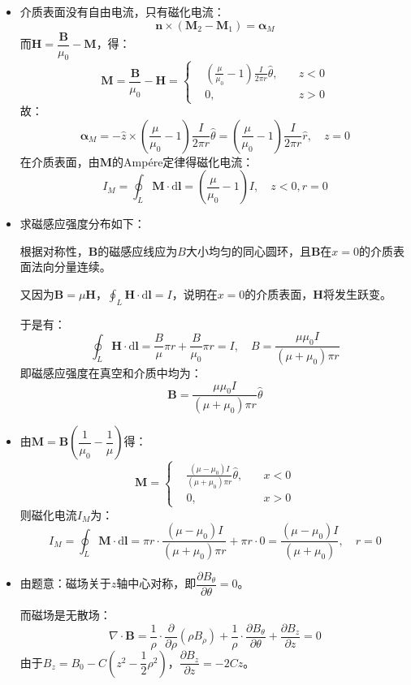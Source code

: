 \documentclass[a4paper,fontset=none]{ctexart}
\begin{document}
\begin{itemize}
    \item[3.(2)]
    介质表面没有自由电流，只有磁化电流：
    \[
    \bm{n}\times(\bm{M}_2-\bm{M}_1) = \bm{\alpha}_M
    \]
    而$\bm{H}=\dfrac{\bm{B}}{\mu_0}-\bm{M}$，得：
    \[
    \bm{M} = \frac{\bm{B}}{\mu_0}-\bm{H} =
    \left\{
        \begin{aligned}
            &\left(\frac{\mu}{\mu_0}-1\right)\frac{I}{2\pi r}\hat{\theta},\quad &z<0 \\
            &0,\quad &z>0
        \end{aligned}
    \right.
    \]
    故：
    \[
    \bm{\alpha}_M = -\hat{z}\times\left(\frac{\mu}{\mu_0}-1\right)\frac{I}{2\pi r}\hat{\theta} = \left(\frac{\mu}{\mu_0}-1\right)\frac{I}{2\pi r}\hat{r},\quad z=0
    \]
    在介质表面，由$\bm{M}$的Amp\'{e}re定律得磁化电流：
    \[
    I_M = \oint_L \bm{M}\cdot\mathrm{d}\bm{l} = \left(\frac{\mu}{\mu_0}-1\right)I,\quad z<0,r=0
    \]

    \item[4.(1)]
    求磁感应强度分布如下：

    根据对称性，$\bm{B}$的磁感应线应为$B$大小均匀的同心圆环，且$\bm{B}$在$x=0$的介质表面法向分量连续。
    
    又因为$\bm{B}=\mu\bm{H}$，$\displaystyle{\oint_L \bm{H}\cdot\mathrm{d}\bm{l}=I}$，说明在$x=0$的介质表面，$\bm{H}$将发生跃变。

    于是有：
    \[
    \oint_L \bm{H}\cdot\mathrm{d}\bm{l} = \frac{B}{\mu}\pi r + \frac{B}{\mu_0}\pi r = I,\quad B = \frac{\mu\mu_0 I}{(\mu+\mu_0)\pi r}
    \]
    即磁感应强度在真空和介质中均为：
    \[
    \bm{B} = \frac{\mu\mu_0 I}{(\mu+\mu_0)\pi r}\hat{\theta}
    \]

    \item[4.(2)]
    由$\bm{M}=\bm{B}\left(\dfrac{1}{\mu_0}-\dfrac{1}{\mu}\right)$得：
    \[
    \bm{M} =
    \left\{
        \begin{aligned}
            &\frac{(\mu-\mu_0)I}{(\mu+\mu_0)\pi r}\hat{\theta},\quad &x<0 \\
            &0,\quad &x>0
        \end{aligned}
    \right.
    \]
    则磁化电流$I_M$为：
    \[
    I_M = \oint_L \bm{M}\cdot\mathrm{d}\bm{l} = \pi r \cdot \frac{(\mu-\mu_0)I}{(\mu+\mu_0)\pi r} + \pi r \cdot 0 = \frac{(\mu-\mu_0)I}{(\mu+\mu_0)},\quad r=0
    \]

    \item[5.]
    由题意：磁场关于$z$轴中心对称，即$\dfrac{\partial B_\theta}{\partial\theta}=0$。

    而磁场是无散场：
    \[
    \nabla\cdot\bm{B} = \frac{1}{\rho}\cdot\frac{\partial}{\partial\rho}(\rho B_\rho) + \frac{1}{\rho}\cdot\frac{\partial B_\theta}{\partial\theta} + \frac{\partial B_z}{\partial z} = 0
    \]
    由于$B_z=B_0-C(z^2-\dfrac{1}{2}\rho^2)$，$\dfrac{\partial B_z}{\partial z}=-2Cz$。


\end{itemize}
\end{document}
